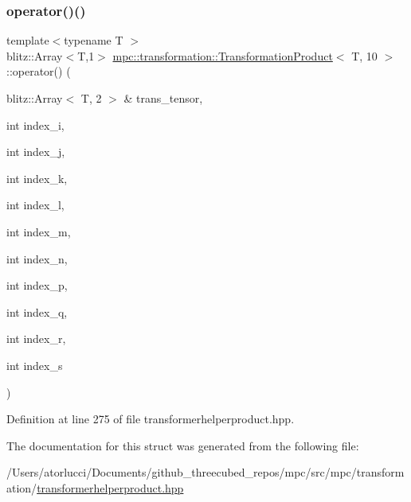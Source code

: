 \subsubsection{\texorpdfstring{operator()()}{operator()()}}
{\footnotesize\ttfamily template$<$typename T $>$ \\
blitz\+::\+Array$<$T,1$>$ \mbox{\hyperlink{structmpc_1_1transformation_1_1_transformation_product}{mpc\+::transformation\+::\+Transformation\+Product}}$<$ T, 10 $>$\+::operator() (\begin{DoxyParamCaption}\item[{blitz\+::\+Array$<$ T, 2 $>$ \&}]{trans\+\_\+tensor,  }\item[{int}]{index\+\_\+i,  }\item[{int}]{index\+\_\+j,  }\item[{int}]{index\+\_\+k,  }\item[{int}]{index\+\_\+l,  }\item[{int}]{index\+\_\+m,  }\item[{int}]{index\+\_\+n,  }\item[{int}]{index\+\_\+p,  }\item[{int}]{index\+\_\+q,  }\item[{int}]{index\+\_\+r,  }\item[{int}]{index\+\_\+s }\end{DoxyParamCaption})\hspace{0.3cm}{\ttfamily [inline]}}



Definition at line 275 of file transformerhelperproduct.\+hpp.



The documentation for this struct was generated from the following file\+:\begin{DoxyCompactItemize}
\item 
/\+Users/atorlucci/\+Documents/github\+\_\+threecubed\+\_\+repos/mpc/src/mpc/transformation/\mbox{\hyperlink{transformerhelperproduct_8hpp}{transformerhelperproduct.\+hpp}}\end{DoxyCompactItemize}
